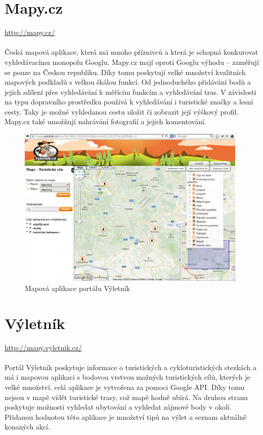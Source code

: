 \documentclass[11pt,a4paper,titlepage,oneside]{book}
\begin{document}
	\section{Mapy.cz}
		\url{http://mapy.cz/}
		\paragraph{} Česká mapová aplikace, která má mnoho příznivců a která je schopná konkurovat vyhledávacímu monopolu Googlu. Mapy.cz mají oproti Googlu výhodu -- zaměřují se pouze na Českou republiku. Díky tomu poskytují velké množství kvalitních mapových podkladů s velkou škálou funkcí. Od jednoduchého přidávání bodů a jejich sdílení přes vyhledávání k měřícím funkcím a vyhledávání tras. V závislosti na typu dopravního prostředku používá k vyhledávání i turistické značky a lesní cesty. Taky je možné vyhledanou cestu uložit či zobrazit její výškový profil. Mapy.cz také umožňují nahrávání fotografií a jejich komentování.

		\begin{figure}[!h]
			\begin{center}
				\includegraphics[width=11cm]{obrazky/vyletnik.png}
				\caption{Mapová aplikace portálu Výletník}
			\end{center}
		\end{figure}

	\section{Výletník}
		\url{http://mapy.vyletnik.cz/}
		\paragraph{} Portál Výletník poskytuje informace o turistických a cykloturistických stezkách a má i mapovou aplikaci s bodovou vrstvou možných turistických cílů, kterých je velké množství. celá aplikace je vytvořena za pomoci Google API. Díky tomu nejsou v mapě vidět turistické trasy, což mapě hodně ubírá. Na druhou stranu poskytuje možnosti vyhledat ubytování a vyhledat zájmové body v okolí. Přidanou hodnotou této aplikace je množství tipů na výlet a seznam aktuálně konaných akcí.
	
\end{document}
